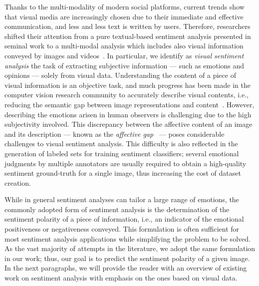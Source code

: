 Thanks to the multi-modality of modern social platforms, current trends show that visual media are increasingly chosen due to their immediate and effective communication, and less and less text is written by users.
Therefore, researchers shifted their attention from a pure textual-based sentiment analysis presented in seminal work to a multi-modal analysis which includes also visual information conveyed by images and videos~\cite{borth2013large,cao2016cross,jou2015visual,siersdorfer2010analyzing,you2015robust,you2016cross}.
In particular, we identify as \emph{visual sentiment analysis} the task of extracting subjective information --- such as emotions and opinions --- solely from visual data.
Understanding the content of a piece of visual information is an objective task, and much progress has been made in the computer vision research community to accurately describe visual contents, i.e., reducing the semantic gap between image representations and content~\cite{li2016socializing}.
However, describing the emotions arisen in human observers is challenging due to the high subjectivity involved.
This discrepancy between the affective content of an image and its description --- known as the \emph{affective gap}~\cite{siersdorfer2010analyzing} --- poses considerable challenges to visual sentiment analysis.
This difficulty is also reflected in the generation of labeled sets for training sentiment classifiers;
several emotional judgments by multiple annotators are usually required to obtain a high-quality sentiment ground-truth for a single image, thus increasing the cost of dataset creation.

While in general sentiment analyses can tailor a large range of emotions, the commonly adopted form of sentiment analysis is the determination of the sentiment polarity of a piece of information, i.e., an indicator of the emotional positiveness or negativeness conveyed.
This formulation is often sufficient for most sentiment analysis applications while simplifying the problem to be solved.
As the vast majority of attempts in the literature, we adopt the same formulation in our work;
thus, our goal is to predict the sentiment polarity of a given image.
In the next paragraphs, we will provide the reader with an overview of existing work on sentiment analysis with emphasis on the ones based on visual data.


